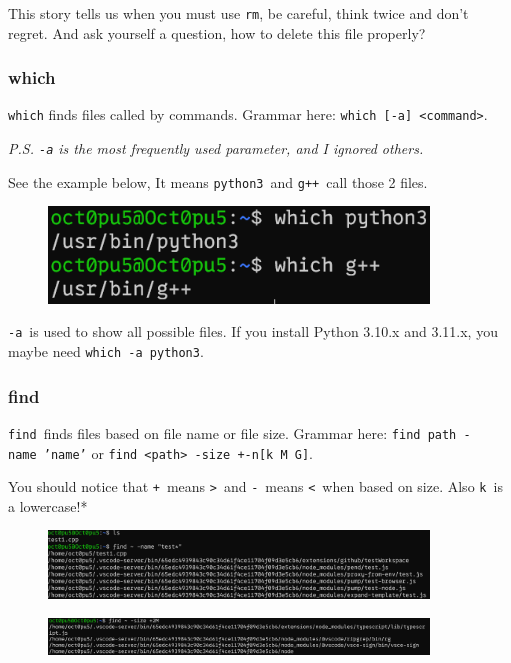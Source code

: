 \documentclass[12pt]{ctexart}
\newenvironment{mdquote}
{%
  \par\noindent
  \begin{list}{}{%
      \setlength{\leftmargin}{1em}%
      \setlength{\rightmargin}{0pt}%
      \setlength{\itemindent}{0pt}%
      \setlength{\listparindent}{\parindent}%
      \setlength{\topsep}{0.5\baselineskip}%
  }
  \item[\textbf{>}\ ]\itshape
}
{\end{list}\par}
\begin{document}
This story tells us when you must use \texttt{rm}, be careful, think
twice and don't regret. And ask yourself a question, how
to delete this file properly?

\subsubsection{\textbf{which}}

\texttt{which} finds files called by commands. Grammar here:
\texttt{which\ {[}-a{]}\ \textless{}command\textgreater{}}.

\emph{P.S. \texttt{-a} is the most frequently used parameter, and I
ignored others.}

See the example below, It means \texttt{python3}\ and \texttt{g++}\ call
those 2 files.

\begin{figure}[H]
    \centering
    \includegraphics[width=0.9\textwidth,keepaspectratio]{assets/Linux/1.5 Linux file commands/7.png}
\end{figure}

\texttt{-a}\ is used to show all possible files. If you install Python
3.10.x and 3.11.x, you maybe need \texttt{which\ -a\ python3}.

\subsubsection{\textbf{find}}

\texttt{find}\ finds files based on file name or file size. Grammar here:
\texttt{find\ path\ -name\ 'name'} or
\texttt{find\ \textless{}path\textgreater{}\ -size\ +\textbar{}-n{[}k\ M\ G{]}}.


\begin{mdquote}
You should notice that \texttt{+}\ means \texttt{\textgreater{}}\ and
\texttt{-}\ means \texttt{\textless{}}\ when based on size. Also
\texttt{k}\ is a lowercase!*

\begin{figure}[H]
    \centering
    \includegraphics[width=0.9\textwidth,keepaspectratio]{assets/Linux/1.5 Linux file commands/8.png}
\end{figure}

\begin{figure}[H]
    \centering
    \includegraphics[width=0.9\textwidth,keepaspectratio]{assets/Linux/1.5 Linux file commands/9.png}
\end{figure}
\end{mdquote}
\end{document}
